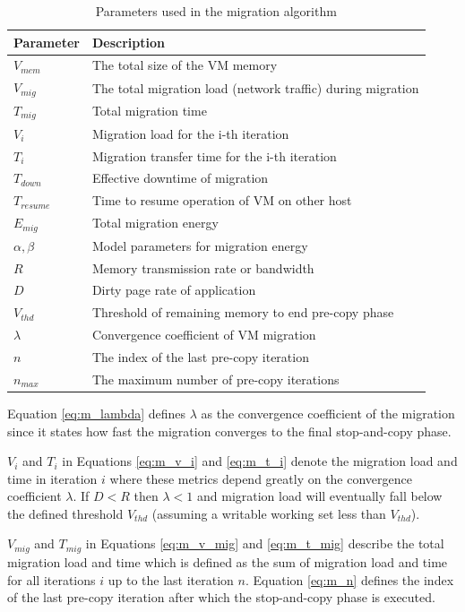 \begin{table}[htbp]
\centering
\begin{tabular}{ll}
  \hline
	Parameter & Description \\ 
  \hline
		$V_{mem}$ & The total size of the VM memory \\ 
		$V_{mig}$ & The total migration load (network traffic) during migration \\ 
		$T_{mig}$ & Total migration time \\ 
		$V_i$ & Migration load for the i-th iteration \\ 
		$T_i$ & Migration transfer time for the i-th iteration \\ 
		$T_{down}$ & Effective downtime of migration \\ 
		$T_{resume}$ & Time to resume operation of VM on other host \\ 
		$E_{mig}$ & Total migration energy \\ 
		$\alpha, \beta$ & Model parameters for migration energy \\
		$R$ & Memory transmission rate or bandwidth \\ 
		$D$ & Dirty page rate of application \\ 
		$V_{thd}$ & Threshold of remaining memory to end pre-copy phase \\ 
		$\lambda$ & Convergence coefficient of VM migration \\ 
		$n$ & The index of the last pre-copy iteration \\
		$n_{max}$ & The maximum number of pre-copy iterations \\
   \hline
\end{tabular}
\caption{Parameters used in the migration algorithm}
\label{tab:migration_parameters}
\end{table}


Equation \ref{eq:m_lambda} defines $\lambda$ as the convergence coefficient of the migration since it states how fast the migration converges to the final stop-and-copy phase. 

$V_i$ and $T_i$ in Equations \ref{eq:m_v_i} and \ref{eq:m_t_i} denote the migration load and time in iteration $i$ where these metrics depend greatly on the convergence coefficient $\lambda$. If $D < R$ then $\lambda < 1$ and migration load will eventually fall below the defined threshold $V_{thd}$ (assuming a writable working set less than $V_{thd}$). 

$V_{mig}$ and $T_{mig}$ in Equations \ref{eq:m_v_mig} and \ref{eq:m_t_mig} describe the total migration load and time which is defined as the sum of migration load and time for all iterations $i$ up to the last iteration $n$. Equation \ref{eq:m_n} defines the index of the last pre-copy iteration after which the stop-and-copy phase is executed. 

